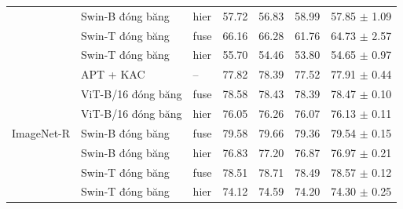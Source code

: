 \documentclass[10pt,a4paper]{article}
\begin{document}
{\begin{longtable}{lllcccc}
 & Swin-B đóng băng & hier & 57.72 & 56.83 & 58.99 & 57.85 $\pm$ 1.09 \\
 & Swin-T đóng băng & fuse & 66.16 & 66.28 & 61.76 & 64.73 $\pm$ 2.57 \\
 & Swin-T đóng băng & hier & 55.70 & 54.46 & 53.80 & 54.65 $\pm$ 0.97 \\
\midrule
\multirow{7}{*}{ImageNet-R} & APT + KAC & -- & 77.82 & 78.39 & 77.52 & 77.91 $\pm$ 0.44 \\
 & ViT-B/16 đóng băng & fuse & 78.58 & 78.43 & 78.39 & 78.47 $\pm$ 0.10 \\
 & ViT-B/16 đóng băng & hier & 76.05 & 76.26 & 76.07 & 76.13 $\pm$ 0.11 \\
 & Swin-B đóng băng & fuse & 79.58 & 79.66 & 79.36 & 79.54 $\pm$ 0.15 \\
 & Swin-B đóng băng & hier & 76.83 & 77.20 & 76.87 & 76.97 $\pm$ 0.21 \\
 & Swin-T đóng băng & fuse & 78.51 & 78.71 & 78.49 & 78.57 $\pm$ 0.12 \\
 & Swin-T đóng băng & hier & 74.12 & 74.59 & 74.20 & 74.30 $\pm$ 0.25 \\
\end{longtable}
}
\end{document}
